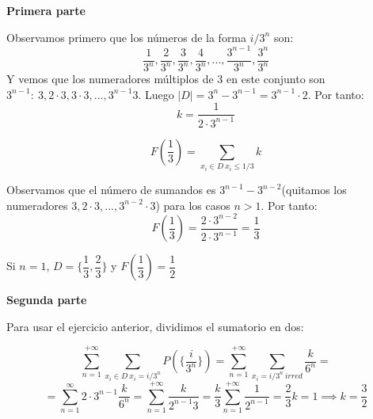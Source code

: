 \documentclass[openany]{book}
\begin{document}
\begin{exercise}
    $  $\\
    \begin{flushright}
        \textbf{Primera parte}
    \end{flushright}
    Observamos primero que los números de la forma $ i/3^{n} $ son:
    $$ \dfrac{1}{3^{n}}, \dfrac{2}{3^{n}},\dfrac{3}{3^{n}},\dfrac{4}{3^{n}},...,\dfrac{3^{n-1}}{3^{n}},\dfrac{3^{n}}{3^{n}} $$
    Y vemos que los numeradores múltiplos de 3 en este conjunto son $ 3^{n-1}:\ 3,2\cdot 3,3\cdot 3,...,3^{n-1}3 $. Luego $ |D|=3^{n}-3^{n-1} = 3^{n-1}\cdot 2 $. Por tanto:
    $$ k = \dfrac{1}{2\cdot 3^{n-1}} $$

    $$ F(\dfrac{1}{3}) = \sum\limits_{x_i \in D\ x_i \leq 1/3}^{} k $$

    Observamos que el número de sumandos es $ 3^{n-1}-3^{n-2} $(quitamos los numeradores $ 3,2\cdot 3,...,3^{n-2}\cdot 3 $)  para los casos $ n > 1 $. Por tanto:
    $$ F(\dfrac{1}{3}) = \dfrac{2 \cdot 3^{n-2}}{2 \cdot 3^{n-1}} = \dfrac{1}{3} $$

    Si $ n = 1 $, $ D = \{\dfrac{1}{3},\dfrac{2}{3}\} $ y $ F(\dfrac{1}{3}) = \dfrac{1}{2} $

    \begin{flushright}
        \textbf{Segunda parte}
    \end{flushright}

    Para usar el ejercicio anterior, dividimos el sumatorio en dos:

    $$ \sum\limits_{n=1}^{+\infty} \sum\limits_{x_i \in D\ x_i = i/3^{n}}^{} P(\{\dfrac{i}{3^{n}}\}) = \sum\limits_{n=1}^{+\infty} \sum\limits_{x_i = i/3^{n}\ irred}^{} \dfrac{k}{6^{n}} =$$$$= \sum\limits_{n=1}^{\infty} 2\cdot 3^{n-1} \dfrac{k}{6^{n}} = \sum\limits_{n=1}^{+\infty} \dfrac{k}{2^{n-1}3} = \dfrac{k}{3} \sum\limits_{n=1}^{+\infty} \dfrac{1}{2^{n-1}} = \dfrac{2}{3}k = 1 \implies k=\dfrac{3}{2}$$

\end{exercise}
\end{document}
